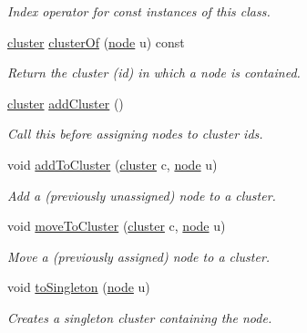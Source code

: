 \begin{DoxyCompactItemize}
\begin{DoxyCompactList}\small\item\em Index operator for const instances of this class. \end{DoxyCompactList}\item 
\hyperlink{namespace_networ_kit_a189884f50c41226806b31842d2214b71}{cluster} \hyperlink{class_networ_kit_1_1_clustering_a2c2dfb71bd9d88609fbb569027793be1}{cluster\-Of} (\hyperlink{namespace_networ_kit_a53fe3e4fd04ea024160e4d024dfebadf}{node} u) const 
\begin{DoxyCompactList}\small\item\em Return the cluster (id) in which a node is contained. \end{DoxyCompactList}\item 
\hyperlink{namespace_networ_kit_a189884f50c41226806b31842d2214b71}{cluster} \hyperlink{class_networ_kit_1_1_clustering_a17835c3aaee8a0f76c3f49201eaab5ea}{add\-Cluster} ()
\begin{DoxyCompactList}\small\item\em Call this before assigning nodes to cluster ids. \end{DoxyCompactList}\item 
void \hyperlink{class_networ_kit_1_1_clustering_a8c6557683ca585e65d349b01368260ea}{add\-To\-Cluster} (\hyperlink{namespace_networ_kit_a189884f50c41226806b31842d2214b71}{cluster} c, \hyperlink{namespace_networ_kit_a53fe3e4fd04ea024160e4d024dfebadf}{node} u)
\begin{DoxyCompactList}\small\item\em Add a (previously unassigned) node to a cluster. \end{DoxyCompactList}\item 
void \hyperlink{class_networ_kit_1_1_clustering_abe2ac522cb7634610e5871dc1d20a50f}{move\-To\-Cluster} (\hyperlink{namespace_networ_kit_a189884f50c41226806b31842d2214b71}{cluster} c, \hyperlink{namespace_networ_kit_a53fe3e4fd04ea024160e4d024dfebadf}{node} u)
\begin{DoxyCompactList}\small\item\em Move a (previously assigned) node to a cluster. \end{DoxyCompactList}\item 
void \hyperlink{class_networ_kit_1_1_clustering_a125f8927d49371ee65329f63d31c43cd}{to\-Singleton} (\hyperlink{namespace_networ_kit_a53fe3e4fd04ea024160e4d024dfebadf}{node} u)
\begin{DoxyCompactList}\small\item\em Creates a singleton cluster containing the node. \end{DoxyCompactList}\item 

\end{DoxyCompactItemize}
